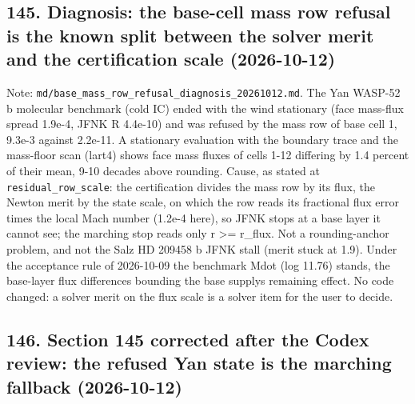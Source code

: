 \documentclass[english,a4paper]{my_memo}
\begin{document}
\subsection{145. Diagnosis: the base-cell mass row refusal is the known split between the solver merit and the certification scale (2026-10-12)}\label{145-diagnosis-the-base-cell-mass-row-refusal-is-the-known-split-between-the-solver-merit-and-the-certification-scale-2026-10-12}

Note: \texttt{md/base\_mass\_row\_refusal\_diagnosis\_20261012.md}. The Yan WASP-52 b molecular benchmark (cold IC) ended with the wind stationary (face mass-flux spread 1.9e-4, JFNK \textbar\textbar R\textbar\textbar{} 4.4e-10) and was refused by the mass row of base cell 1, 9.3e-3 against 2.2e-11. A stationary evaluation with the boundary trace and the mass-floor scan (lart4) shows face mass fluxes of cells 1-12 differing by 1.4 percent of their mean, 9-10 decades above rounding. Cause, as stated at \texttt{residual\_row\_scale}: the certification divides the mass row by its flux, the Newton merit by the state scale, on which the row reads its fractional flux error times the local Mach number (1.2e-4 here), so JFNK stops at a base layer it cannot see; the marching stop reads only r \textgreater= r\_flux. Not a rounding-anchor problem, and not the Salz HD 209458 b JFNK stall (merit stuck at 1.9). Under the acceptance rule of 2026-10-09 the benchmark Mdot (log 11.76) stands, the base-layer flux differences bounding the base supply\textquotesingle s remaining effect. No code changed: a solver merit on the flux scale is a solver item for the user to decide.

\subsection{146. Section 145 corrected after the Codex review: the refused Yan state is the marching fallback (2026-10-12)}\label{146-section-145-corrected-after-the-codex-review-the-refused-yan-state-is-the-marching-fallback-2026-10-12}
\end{document}
